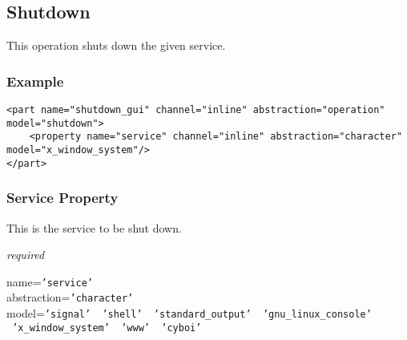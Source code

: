 %
%
%
%
%
%

\subsection{Shutdown}
\label{shutdown_heading}

This operation shuts down the given service.

\subsubsection{Example}

\begin{scriptsize}
    \begin{verbatim}
<part name="shutdown_gui" channel="inline" abstraction="operation" model="shutdown">
    <property name="service" channel="inline" abstraction="character" model="x_window_system"/>
</part>
    \end{verbatim}
\end{scriptsize}

\subsubsection{Service Property}

This is the service to be shut down.

\emph{required}

name=\texttt{'service'}\\
abstraction=\texttt{'character'}\\
model=\texttt{'signal' \vline\ 'shell' \vline\ 'standard\_output'
    \vline\ 'gnu\_linux\_console' \vline\ 'x\_window\_system' \vline\ 'www' \vline\ 'cyboi'}
